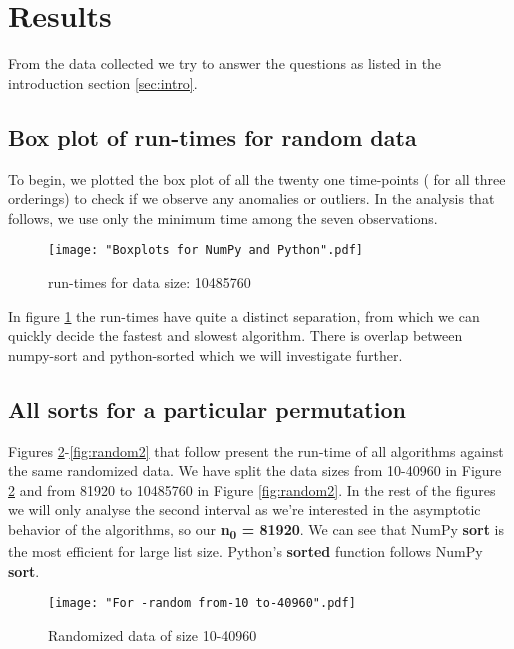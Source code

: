 \documentclass[sigconf, nonacm, natbib, screen, balance=False]{acmart}
\begin{document}
\section{Results}\label{sec:results}
From the data collected we try to answer the questions as listed in the introduction section \ref{sec:intro}.

\subsection{Box plot of run-times for random data }\label{scatter}
To begin, we plotted the box plot of all the twenty one time-points ( for all three orderings) to check if we observe any anomalies or outliers. In the analysis that follows, we use only the minimum time among the seven observations.

\begin{figure}[ht]
\texttt{[image: "Boxplots for NumPy and Python".pdf]}
    \caption{run-times for data size: 10485760 }
    \label{fig:box1}
\end{figure}

In figure \ref{fig:box1} the run-times have quite a distinct separation, from which we can quickly decide the fastest and slowest algorithm. There is overlap between numpy-sort and python-sorted which we will investigate further.

\subsection{All sorts for a particular permutation }\label{allsorts}

Figures \ref{fig:random1}-\ref{fig:random2} that follow present the run-time of all algorithms against the same randomized data. We have split the data sizes from 10-40960 in Figure \ref{fig:random1} and from 81920 to 10485760 in Figure \ref{fig:random2}. In the rest of the figures we will only analyse the second interval as we're interested in the asymptotic behavior of the algorithms, so our \textbf{n\textsubscript{0} = 81920}.\newline
We can see that NumPy \textbf{sort} is the most efficient for large list size. Python's \textbf{sorted} function follows NumPy \textbf{sort}.

\begin{figure}[ht]
\texttt{[image: "For -random from-10 to-40960".pdf]}
    \caption{Randomized data of size 10-40960 }
    \label{fig:random1}
\end{figure}
\end{document}

